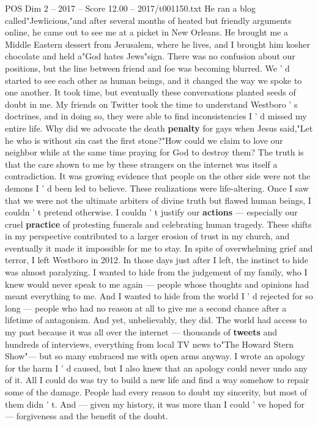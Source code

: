\begin{textsample}{POS Dim 2 – 2017 – Score 12.00 – 2017/t001150.txt}
He ran a blog called"Jewlicious,"and after several months of heated but friendly arguments online, he came out to see me at a picket in New Orleans.
He brought me a Middle Eastern dessert from Jerusalem, where he lives, and I brought him kosher chocolate and held a"God hates Jews"sign.
There was no confusion about our positions, but the line between friend and foe was becoming blurred.
We ' d started to see each other as human beings, and it changed the way we spoke to one another.
It took time, but eventually these conversations planted seeds of doubt in me.
My friends on Twitter took the time to understand Westboro ' s doctrines, and in doing so, they were able to find inconsistencies I ' d missed my entire life.
Why did we advocate the death \textbf{penalty} for gays when Jesus said,"Let he who is without sin cast the first stone?"How could we claim to love our neighbor while at the same time praying for God to destroy them?
The truth is that the care shown to me by these strangers on the internet was itself a contradiction.
It was growing evidence that people on the other side were not the demons I ' d been led to believe.
These realizations were life-altering.
Once I saw that we were not the ultimate arbiters of divine truth but flawed human beings, I couldn ' t pretend otherwise.
I couldn ' t justify our \textbf{actions} — especially our cruel \textbf{practice} of protesting funerals and celebrating human tragedy.
These shifts in my perspective contributed to a larger erosion of trust in my church, and eventually it made it impossible for me to stay.
In spite of overwhelming grief and terror, I left Westboro in 2012.
In those days just after I left, the instinct to hide was almost paralyzing.
I wanted to hide from the judgement of my family, who I knew would never speak to me again — people whose thoughts and opinions had meant everything to me.
And I wanted to hide from the world I ' d rejected for so long — people who had no reason at all to give me a second chance after a lifetime of antagonism.
And yet, unbelievably, they did.
The world had access to my past because it was all over the internet — thousands of \textbf{tweets} and hundreds of interviews, everything from local TV news to"The Howard Stern Show"— but so many embraced me with open arms anyway.
I wrote an apology for the harm I ' d caused, but I also knew that an apology could never undo any of it.
All I could do was try to build a new life and find a way somehow to repair some of the damage.
People had every reason to doubt my sincerity, but most of them didn ' t.
And — given my history, it was more than I could ' ve hoped for — forgiveness and the benefit of the doubt.

\end{textsample}
